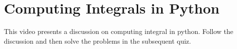 \section{Computing Integrals in Python}
\begin{youtube}
This video presents a discussion on computing integral in python. Follow the discussion and then solve the problems in the subsequent quiz.
\end{youtube}




